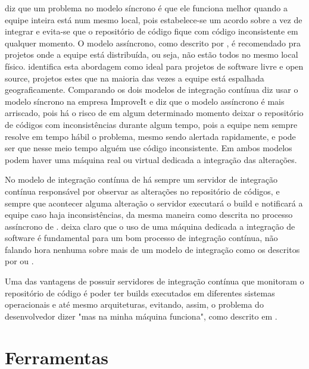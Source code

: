 \documentclass[10pt,a4paper,font=plain]{abnt}
\begin{document}
 diz que um problema no modelo síncrono é que ele funciona melhor quando a equipe inteira está num mesmo local, pois estabelece-se um acordo sobre a vez de integrar e evita-se que o repositório de código fique com código inconsistente em qualquer momento.
O modelo assíncrono, como descrito por , é recomendado pra projetos onde a equipe está distribuída, ou seja, não estão todos no mesmo local físico.  identifica esta abordagem como ideal para projetos de software livre e open source, projetos estes que na maioria das vezes a equipe está espalhada geograficamente.
Comparando os dois modelos de integração contínua  diz usar o modelo síncrono na empresa ImproveIt e diz que o modelo assíncrono é mais arriscado, pois há o risco de em algum determinado momento deixar o repositório de códigos com inconsistências durante algum tempo, pois a equipe nem sempre resolve em tempo hábil o problema, mesmo sendo alertada rapidamente, e pode ser que nesse meio tempo alguém use código inconsistente.
Em ambos modelos podem haver uma máquina real ou virtual dedicada a integração das alterações.

No modelo de integração contínua de  há sempre um servidor de integração contínua responsável por observar as alterações no repositório de códigos, e sempre que acontecer alguma alteração o servidor executará o build e notificará a equipe caso haja inconsistências, da mesma maneira como descrita no processo assíncrono de .  deixa claro que o uso de uma máquina dedicada a integração de software é fundamental para um bom processo de integração contínua, não falando hora nenhuma sobre mais de um modelo de integração como os descritos por  ou .

Uma das vantagens de possuir servidores de integração contínua que monitoram o repositório de código é poder ter builds executados em diferentes sistemas operacionais e até mesmo arquiteturas, evitando, assim, o problema do desenvolvedor dizer "mas na minha máquina funciona", como descrito em .

\section{Ferramentas}
\end{document}
